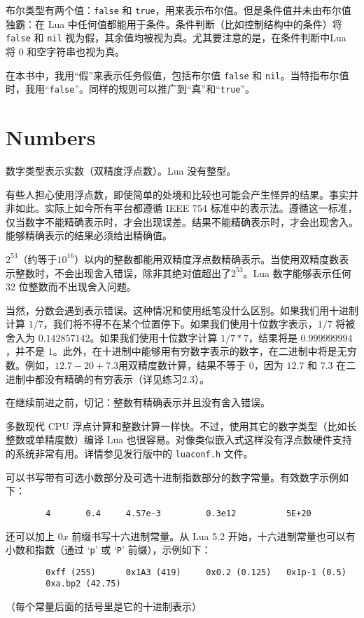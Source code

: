 布尔类型有两个值：\verb|false| 和 \verb|true|，用来表示布尔值。但是条件值并未由布尔值独霸：在 Lua 中任何值都能用于条件。条件判断（比如控制结构中的条件）将 \verb|false| 和 \verb|nil| 视为假，其余值均被视为真。尤其要注意的是，在条件判断中Lua 将 0 和空字符串也视为真。

在本书中，我用“假”来表示任务假值，包括布尔值 \verb|false| 和 \verb|nil|。当特指布尔值时，我用“\verb|false|”。同样的规则可以推广到“真”和“\verb|true|”。

\section{Numbers}

数字类型表示实数（双精度浮点数）。Lua 没有整型。

有些人担心使用浮点数，即使简单的处境和比较也可能会产生怪异的结果。事实并非如此。实际上如今所有平台都遵循 IEEE 754 标准中的表示法。遵循这一标准，仅当数字不能精确表示时，才会出现误差。结果不能精确表示时，才会出现舍入。能够精确表示的结果必须给出精确值。

$2^{53}$（约等于$10^{16}$）以内的整数都能用双精度浮点数精确表示。当使用双精度数表示整数时，不会出现舍入错误，除非其绝对值超出了$2^{53}$。Lua 数字能够表示任何 32 位整数而不出现舍入问题。

当然，分数会遇到表示错误。这种情况和使用纸笔没什么区别。如果我们用十进制计算 $1/7$，我们将不得不在某个位置停下。如果我们使用十位数字表示，$1/7$ 将被舍入为 $0.142857142$。如果我们使用十位数字计算 $1/7*7$，结果将是 $0.999999994$，并不是 $1$。此外，在十进制中能够用有穷数字表示的数字，在二进制中将是无穷数。例如，$12.7-20+7.3$用双精度数计算，结果不等于 $0$，因为 $12.7$ 和 $7.3$ 在二进制中都没有精确的有穷表示（详见练习2.3）。

在继续前进之前，切记：整数有精确表示并且没有舍入错误。

多数现代 CPU 浮点计算和整数计算一样快。不过，使用其它的数字类型（比如长整数或单精度数）编译 Lua 也很容易。对像类似嵌入式这样没有浮点数硬件支持的系统非常有用。详情参见发行版中的 \verb|luaconf.h| 文件。

可以书写带有可选小数部分及可选十进制指数部分的数字常量。有效数字示例如下：
\begin{verbatim}
        4       0.4     4.57e-3         0.3e12          5E+20
\end{verbatim}
还可以加上 $0x$ 前缀书写十六进制常量。从 Lua 5.2 开始，十六进制常量也可以有小数和指数（通过 `\verb|p|' 或 `\verb|P|' 前缀），示例如下：
\begin{verbatim}
        0xff (255)      0x1A3 (419)     0x0.2 (0.125)   0x1p-1 (0.5)
        0xa.bp2 (42.75)
\end{verbatim}
（每个常量后面的括号里是它的十进制表示）

